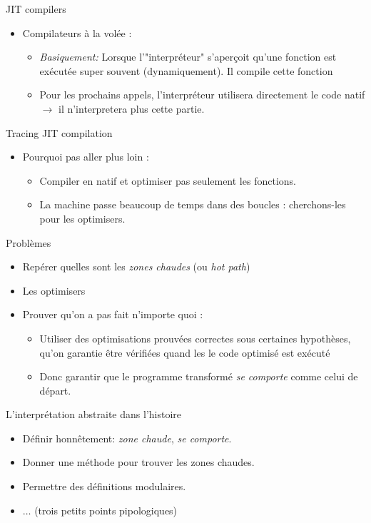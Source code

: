 \documentclass{beamer}
\begin{document}
\begin{frame}{JIT compilers}
\begin{itemize}
\item Compilateurs à la volée : 
\begin{itemize}
\item \emph{Basiquement:} Lorsque l'"interpréteur" s'aperçoit qu'une fonction
est exécutée super souvent (dynamiquement). Il compile cette fonction
\item Pour les prochains appels, l'interpréteur utilisera directement le code
natif $\rightarrow$ il n'interpretera plus cette partie.
\end{itemize}
\end{itemize}
\end{frame}

\begin{frame}{Tracing JIT compilation}
\begin{itemize}
\item Pourquoi pas aller plus loin : 
\pause
\begin{itemize}
\item Compiler en natif et optimiser pas seulement les fonctions.
\item La machine passe beaucoup de temps dans des boucles : cherchons-les pour
les optimisers.
\end{itemize}  
\end{itemize}
\end{frame}

\begin{frame}{Problèmes}
\begin{itemize}
\item Repérer quelles sont les \emph{zones chaudes} (ou \emph{hot path})
\item Les optimisers
\item Prouver qu'on a pas fait n'importe quoi :
\begin{itemize}
\item Utiliser des optimisations prouvées correctes sous certaines hypothèses,
qu'on garantie être vérifiées quand les le code optimisé est exécuté
\item Donc garantir que le programme transformé \emph{se comporte} comme celui de
départ.
\end{itemize}
\end{itemize}
\end{frame}

\begin{frame}{L'interprétation abstraite dans l'histoire}
\begin{itemize}
\item Définir honnêtement: \emph{zone chaude}, \emph{se comporte}.
\item Donner une méthode pour trouver les zones chaudes.
\item Permettre des définitions modulaires. 
\item \emph{$\dots$} (trois petits points pipologiques)
\end{itemize}
\end{frame}
\end{document}
